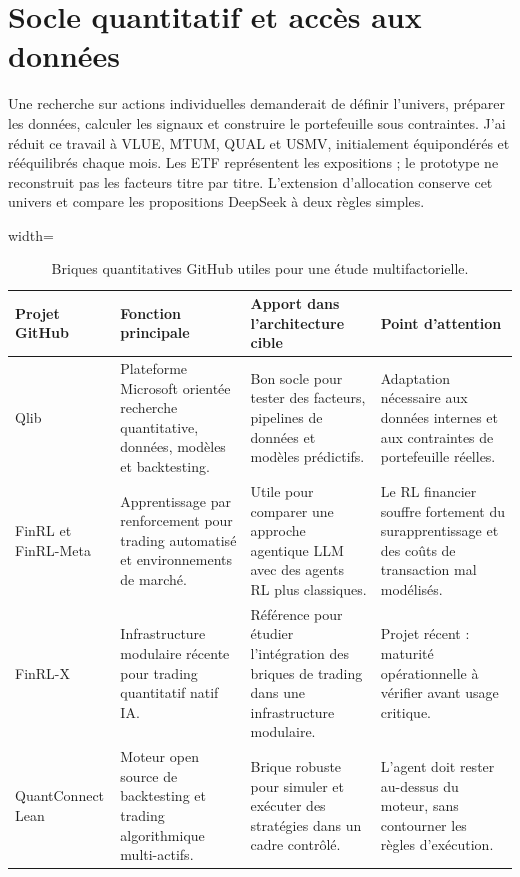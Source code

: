 \section{Socle quantitatif et accès aux données}

Une recherche sur actions individuelles demanderait de définir l'univers, préparer les données, calculer les signaux et construire le portefeuille sous contraintes. J'ai réduit ce travail à VLUE, MTUM, QUAL et USMV, initialement équipondérés et rééquilibrés chaque mois. Les ETF représentent les expositions ; le prototype ne reconstruit pas les facteurs titre par titre. L'extension d'allocation conserve cet univers et compare les propositions DeepSeek à deux règles simples.

\begin{table}[H]
\centering
\caption{Briques quantitatives GitHub utiles pour une étude multifactorielle.}
\label{tab:github-quant}
\scriptsize
\begin{adjustbox}{width=\textwidth}
\begin{tabular}{p{}p{}p{}p{}}
\toprule
\textbf{Projet GitHub} & \textbf{Fonction principale} & \textbf{Apport dans l'architecture cible} & \textbf{Point d'attention} \\
\midrule
Qlib \citep{githubQlib} & Plateforme Microsoft orientée recherche quantitative, données, modèles et backtesting. & Bon socle pour tester des facteurs, pipelines de données et modèles prédictifs. & Adaptation nécessaire aux données internes et aux contraintes de portefeuille réelles. \\
FinRL \citep{githubFinRL} et FinRL-Meta \citep{githubFinRLMeta} & Apprentissage par renforcement pour trading automatisé et environnements de marché. & Utile pour comparer une approche agentique LLM avec des agents RL plus classiques. & Le RL financier souffre fortement du surapprentissage et des coûts de transaction mal modélisés. \\
FinRL-X \citep{finrlx2026} & Infrastructure modulaire récente pour trading quantitatif natif IA. & Référence pour étudier l'intégration des briques de trading dans une infrastructure modulaire. & Projet récent : maturité opérationnelle à vérifier avant usage critique. \\
QuantConnect Lean \citep{githubLean} & Moteur open source de backtesting et trading algorithmique multi-actifs. & Brique robuste pour simuler et exécuter des stratégies dans un cadre contrôlé. & L'agent doit rester au-dessus du moteur, sans contourner les règles d'exécution. \\

\end{tabular}
\end{adjustbox}
\end{table}

